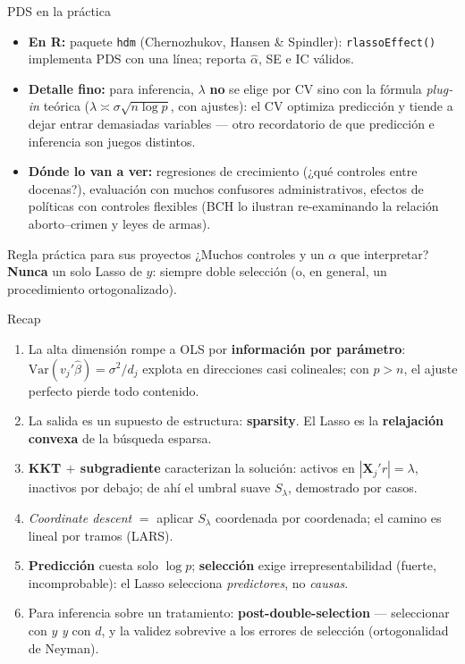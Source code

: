 \documentclass{beamer}
\newcommand{\Var}{\mathrm{Var}}
\newcommand{\1}{\mathbb{I}}
\begin{document}
\begin{frame}{PDS en la práctica}
\small
\begin{itemize}\itemsep6pt
  \item \textbf{En R:} paquete \texttt{hdm} (Chernozhukov, Hansen \& Spindler): \texttt{rlassoEffect()} implementa PDS con una línea; reporta $\hat{\alpha}$, SE e IC válidos. \pause
  \item \textbf{Detalle fino:} para inferencia, $\lambda$ \textbf{no} se elige por CV sino con la fórmula \emph{plug-in} teórica ($\lambda \asymp \sigma\sqrt{n\log p}$, con ajustes): el CV optimiza predicción y tiende a dejar entrar demasiadas variables --- otro recordatorio de que predicción e inferencia son juegos distintos. \pause
  \item \textbf{Dónde lo van a ver:} regresiones de crecimiento (¿qué controles entre docenas?), evaluación con muchos confusores administrativos, efectos de políticas con controles flexibles (BCH lo ilustran re-examinando la relación aborto--crimen y leyes de armas). \pause
\end{itemize}

\vspace{0.1cm}
\begin{block}{Regla práctica para sus proyectos}
¿Muchos controles y un $\alpha$ que interpretar? \textbf{Nunca} un solo Lasso de $y$: siempre doble selección (o, en general, un procedimiento ortogonalizado).
\end{block}
\end{frame}

\begin{frame}{Recap}
\small
\begin{enumerate}\itemsep6pt
  \item La alta dimensión rompe a OLS por \textbf{información por parámetro}: $\Var(v_j'\hat{\beta}) = \sigma^2/d_j$ explota en direcciones casi colineales; con $p > n$, el ajuste perfecto pierde todo contenido.
  \item La salida es un supuesto de estructura: \textbf{sparsity}. El Lasso es la \textbf{relajación convexa} de la búsqueda esparsa.
  \item \textbf{KKT $+$ subgradiente} caracterizan la solución: activos en $|\mathbf{X}_j'r| = \lambda$, inactivos por debajo; de ahí el umbral suave $S_\lambda$, demostrado por casos.
  \item \emph{Coordinate descent} $=$ aplicar $S_\lambda$ coordenada por coordenada; el camino es lineal por tramos (LARS).
  \item \textbf{Predicción} cuesta solo $\log p$; \textbf{selección} exige irrepresentabilidad (fuerte, incomprobable): el Lasso selecciona \emph{predictores}, no \emph{causas}.
  \item Para inferencia sobre un tratamiento: \textbf{post-double-selection} --- seleccionar con $y$ \emph{y} con $d$, y la validez sobrevive a los errores de selección (ortogonalidad de Neyman).
\end{enumerate}
\end{frame}
\end{document}
